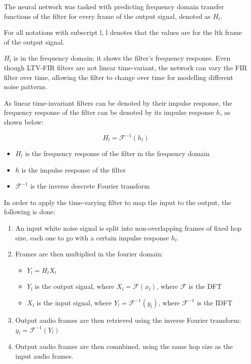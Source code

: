 The neural network was tasked with predicting frequency domain transfer functions of the filter for every frame of the output signal, denoted as $H_l$\cite{OriginalDDSP}.

For all notations with subscript l, l denotes that the values are for the lth frame of the output signal.

$H_l$ is in the frequency domain; it shows the filter's frequency response. Even though LTV-FIR filters are not linear time-variant, the network can vary the FIR filter over time, allowing the filter to change over time for modelling different noise patterns.

As linear time-invariant filters can be denoted by their impulse response, the frequency response of the filter can be denoted by its impulse response $h$, as shown below:

\begin{equation}
    H_l = \mathscr{F}^{-1}(h_l)
\end{equation}

\begin{itemize}
    \item $H_l$ is the frequency response of the filter in the frequency domain
    \item $h$ is the impulse response of the filter
    \item $\mathscr{F}^{-1}$ is the inverse descrete Fourier transform
\end{itemize}

In order to apply the time-varying filter to map the input to the output, the following is done:

\begin{enumerate}
    \item An input white noise signal is split into non-overlapping frames of fixed hop size, each one to go with a certain impulse response $h_l$.
    \item Frames are then multiplied in the fourier domain: \begin{itemize}
        \item $Y_l = H_l X_l$
        \item $Y_l$ is the output signal, where $X_l = \mathscr{F}(x_l)$, where $\mathscr{F}$ is the \acrfull{DFT}
        \item $X_l$ is the input signal, where $Y_l = \mathscr{F}^{-1}(y_l)$, where $\mathscr{F}^{-1}$ is the \acrfull{IDFT}
    \end{itemize}
    \item Output audio frames are then retrieved using the inverse Fourier transform:
        $y_l = \mathscr{F}^{-1}(Y_l)$
    \item Output audio frames are then comnbined, using the same hop size as the input audio frames.
\end{enumerate}


